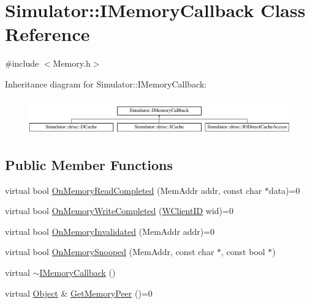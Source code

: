 \hypertarget{class_simulator_1_1_i_memory_callback}{\section{Simulator\+:\+:I\+Memory\+Callback Class Reference}
\label{class_simulator_1_1_i_memory_callback}
}


{\ttfamily \#include $<$Memory.\+h$>$}

Inheritance diagram for Simulator\+:\+:I\+Memory\+Callback\+:\begin{figure}[H]
\begin{center}
\leavevmode
\includegraphics[height=1.568627cm]{class_simulator_1_1_i_memory_callback}
\end{center}
\end{figure}
\subsection*{Public Member Functions}
\begin{DoxyCompactItemize}
\item 
virtual bool \hyperlink{class_simulator_1_1_i_memory_callback_a5519817c435767dab3b4c063e601d9f7}{On\+Memory\+Read\+Completed} (Mem\+Addr addr, const char $\ast$data)=0
\item 
virtual bool \hyperlink{class_simulator_1_1_i_memory_callback_a3821e2dbf7f4d77053c04fc58d2fdcc8}{On\+Memory\+Write\+Completed} (\hyperlink{namespace_simulator_a0de605c35951a450d074222efcef6359}{W\+Client\+I\+D} wid)=0
\item 
virtual bool \hyperlink{class_simulator_1_1_i_memory_callback_a8a50686620585ffe62e754a9e96b79a8}{On\+Memory\+Invalidated} (Mem\+Addr addr)=0
\item 
virtual bool \hyperlink{class_simulator_1_1_i_memory_callback_a41e84f41d39e538c2ab0c056d8c1b0e2}{On\+Memory\+Snooped} (Mem\+Addr, const char $\ast$, const bool $\ast$)
\item 
virtual \hyperlink{class_simulator_1_1_i_memory_callback_a01c8ff9e80ab7d6e578d160716ab0643}{$\sim$\+I\+Memory\+Callback} ()
\item 
virtual \hyperlink{class_simulator_1_1_object}{Object} \& \hyperlink{class_simulator_1_1_i_memory_callback_ab378a4b6ce2df8e4a38bb3e8f116a064}{Get\+Memory\+Peer} ()=0
\end{DoxyCompactItemize}


